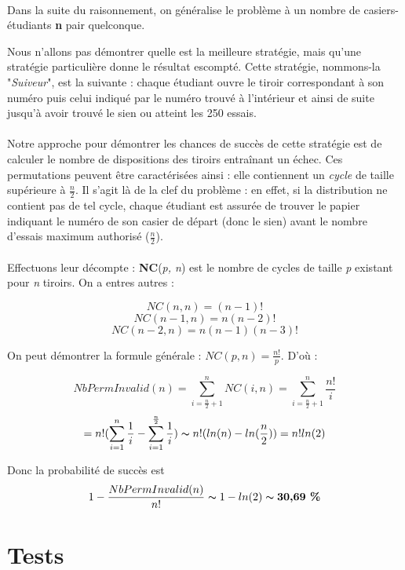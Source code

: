\documentclass[a4paper,11pt]{article}
\begin{document}
    \paragraph {}
Dans la suite du raisonnement, on généralise le problème à un nombre de casiers-étudiants \textbf{n} pair quelconque.

Nous n'allons pas démontrer quelle est la meilleure stratégie, mais qu'une stratégie particulière donne le résultat escompté. Cette stratégie, nommons-la "\textit{Suiveur}", est la suivante : chaque étudiant ouvre le tiroir correspondant à son numéro puis celui indiqué par le numéro trouvé à l'intérieur et ainsi de suite jusqu'à avoir trouvé le sien ou atteint les 250 essais.

    \paragraph {}
Notre approche pour démontrer les chances de succès de cette stratégie est de calculer le nombre de dispositions des tiroirs entraînant un échec. Ces permutations peuvent être caractérisées ainsi : elle contiennent un \textit{cycle} de taille supérieure à $\frac{n}{2}$. Il s'agit là de la clef du problème : en effet, si la distribution ne contient pas de tel cycle, chaque étudiant est assurée de trouver le papier indiquant le numéro de son casier de départ (donc le sien) avant le nombre d'essais maximum authorisé ($\frac{n}{2}$).

    \paragraph {}
Effectuons leur décompte : \textbf{NC}(\textit{p, n}) est le nombre de cycles de taille \textit{p} existant pour \textit{n} tiroirs. On a entres autres :

$$ NC(n,n) = (n - 1)!$$
$$ NC(n-1,n) = n ( n - 2)!$$
$$ NC(n-2, n) = n (n - 1) (n - 3)!$$

On peut démontrer la formule générale : $NC(p,n) = \frac{n!}{p}$.
D'où :

$$ NbPermInvalid(n) = \sum^n_{i = \frac{n}{2} + 1} NC(i,n) = \sum^n_{i = \frac{n}{2} + 1} \frac{n!}{i}$$
$$= n! (\sum^n_{i = 1} \frac{1}{i} - \sum^\frac{n}{2}_{i = 1} \frac{1}{i}) \thicksim n! (ln(n) - ln(\frac{n}{2})) = n! ln(2)$$

Donc la probabilité de succès est
$$1 - \frac{NbPermInvalid(n)}{n!} \thicksim 1 - ln(2) \thicksim \textbf{30,69 \%}$$


\newpage
\section*{Tests}
\end{document}
